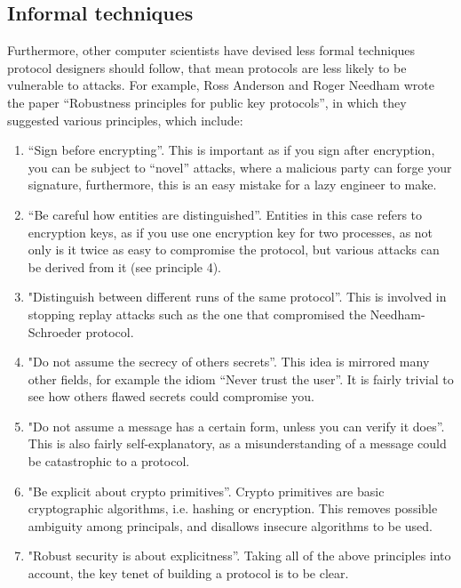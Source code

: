 \documentclass{article}
\begin{document}
\subsection{Informal techniques}
Furthermore, other computer scientists have devised less formal techniques
protocol designers should follow, that mean protocols are less likely to be
vulnerable to attacks. For example, Ross Anderson and Roger Needham wrote the
paper “Robustness principles for public key protocols”, in which they suggested
various principles, which include:
\begin{enumerate}
    \item
        “Sign before encrypting”. This is important as if you sign after
        encryption, you can be subject to “novel” attacks, where a malicious
        party can forge your signature, furthermore, this is an easy mistake for
        a lazy engineer to make.
    \item
        “Be careful how entities are distinguished”. Entities in this case
        refers to encryption keys, as if you use one encryption key for two
        processes, as not only is it twice as easy to compromise the protocol,
        but various attacks can be derived from it (see principle 4).
    \item
        "Distinguish between different runs of the same protocol”. This is
        involved in stopping replay attacks such as the one that compromised the
        Needham-Schroeder protocol.
    \item
        "Do not assume the secrecy of others secrets”. This idea is mirrored
        many other fields, for example the idiom “Never trust the user”. It is
        fairly trivial to see how others flawed secrets could compromise you.
    \item
        "Do not assume a message has a certain form, unless you can verify it
        does”. This is also fairly self-explanatory, as a misunderstanding of a
        message could be catastrophic to a protocol.
    \item
        "Be explicit about crypto primitives”. Crypto primitives  are basic
        cryptographic algorithms, i.e. hashing  or encryption. This removes
        possible ambiguity among principals, and disallows insecure algorithms
        to be used.
    \item
        "Robust security is about explicitness”. Taking all of the above
        principles into account, the key tenet of building a protocol is to be
        clear.
\end{enumerate}
\end{document}
